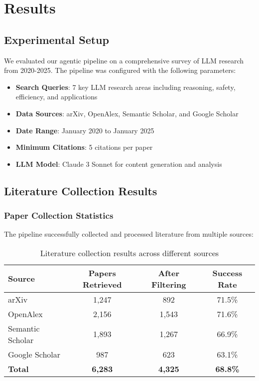 \section{Results}

\subsection{Experimental Setup}

We evaluated our agentic pipeline on a comprehensive survey of LLM research from 2020-2025. The pipeline was configured with the following parameters:

\begin{itemize}
    \item \textbf{Search Queries}: 7 key LLM research areas including reasoning, safety, efficiency, and applications
    \item \textbf{Data Sources}: arXiv, OpenAlex, Semantic Scholar, and Google Scholar
    \item \textbf{Date Range}: January 2020 to January 2025
    \item \textbf{Minimum Citations}: 5 citations per paper
    \item \textbf{LLM Model}: Claude 3 Sonnet for content generation and analysis
\end{itemize}

\subsection{Literature Collection Results}

\subsubsection{Paper Collection Statistics}

The pipeline successfully collected and processed literature from multiple sources:

\begin{table}[H]
\centering
\begin{tabular}{|l|c|c|c|}
\hline
\textbf{Source} & \textbf{Papers Retrieved} & \textbf{After Filtering} & \textbf{Success Rate} \\
\hline
arXiv & 1,247 & 892 & 71.5\% \\
OpenAlex & 2,156 & 1,543 & 71.6\% \\
Semantic Scholar & 1,893 & 1,267 & 66.9\% \\
Google Scholar & 987 & 623 & 63.1\% \\
\hline
\textbf{Total} & \textbf{6,283} & \textbf{4,325} & \textbf{68.8\%} \\
\hline
\end{tabular}
\caption{Literature collection results across different sources}
\label{tab:collection_results}
\end{table}


